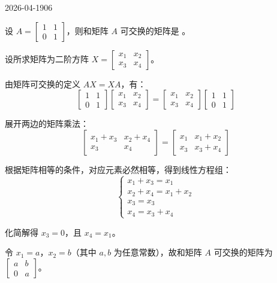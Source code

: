 \begin{mistake}{2026-04-19}{06}

\begin{problemcontent}
设 \(A = \begin{bmatrix} 1 & 1 \\ 0 & 1 \end{bmatrix}\)，则和矩阵 \(A\) 可交换的矩阵是 \underline{\hspace{3cm}}。
\end{problemcontent}

\begin{solutioncontent}
设所求矩阵为二阶方阵 \(X = \begin{bmatrix} x_1 & x_2 \\ x_3 & x_4 \end{bmatrix}\)。

由矩阵可交换的定义 \(AX = XA\)，有：
\[
\begin{bmatrix} 1 & 1 \\ 0 & 1 \end{bmatrix} \begin{bmatrix} x_1 & x_2 \\ x_3 & x_4 \end{bmatrix}
= \begin{bmatrix} x_1 & x_2 \\ x_3 & x_4 \end{bmatrix} \begin{bmatrix} 1 & 1 \\ 0 & 1 \end{bmatrix}
\]

展开两边的矩阵乘法：
\[
\begin{bmatrix} x_1 + x_3 & x_2 + x_4 \\ x_3 & x_4 \end{bmatrix}
= \begin{bmatrix} x_1 & x_1 + x_2 \\ x_3 & x_3 + x_4 \end{bmatrix}
\]

根据矩阵相等的条件，对应元素必然相等，得到线性方程组：
\[
\begin{cases}
x_1 + x_3 = x_1 \\
x_2 + x_4 = x_1 + x_2 \\
x_3 = x_3 \\
x_4 = x_3 + x_4
\end{cases}
\]

化简解得 \(x_3 = 0\)，且 \(x_4 = x_1\)。

令 \(x_1 = a\)，\(x_2 = b\)（其中 \(a, b\) 为任意常数），故和矩阵 \(A\) 可交换的矩阵为 \(\begin{bmatrix} a & b \\ 0 & a \end{bmatrix}\)。
\end{solutioncontent}


\end{mistake}
